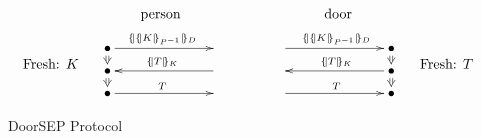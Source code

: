 \documentclass[12pt]{article}
\newcommand{\iv}[1]{\ensuremath{{#1}^{-1}}}
\begin{document}
\begin{figure}[tb]
  \[\begin{array}[c]{rc@{\qquad\qquad}cl}
      & \mbox{person}
      &\mbox{door}
      &\\
      \begin{array}[c]{r} ~ \\ ~ \\
        \mbox{Fresh: $K$}
      \end{array}
      & \xymatrix@R=2mm@C=7em{
      \bullet\ar@{=>}[d]\ar[r]^{\enc{\enc{K}{\iv{P}}}{D}}
      &\\
      \bullet\ar@{=>}[d]& \ar[l]_{\enc{T}{K}}\\
      \bullet \ar[r]^T & }
      &
        \xymatrix@R=2mm@C=7em{
        \ar[r]^{\enc{\enc{K}{\iv{P}}}{D}}    &\bullet\ar@{=>}[d]\\
      &\bullet\ar@{=>}[d] \ar[l]_{\enc{T}{K}}\\
      \ar[r]^T      &\bullet}
      &
        \begin{array}[c]{r} ~ \\ ~ \\
          \mbox{Fresh: $T$}
        \end{array}
  \end{array}\]
  \caption{DoorSEP Protocol}\label{fig:doorsep protocol}
\end{figure}

\end{document}
